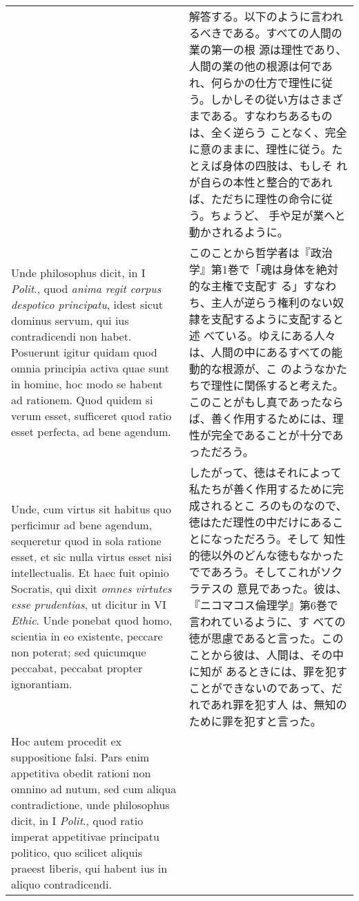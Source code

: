 \documentclass[10pt]{jsarticle}
\begin{document}
\begin{longtable}{p{21em}p{21em}}
&

 解答する。以下のように言われるべきである。すべての人間の業の第一の根
 源は理性であり、人間の業の他の根源は何であれ、何らかの仕方で理性に従
 う。しかしその従い方はさまざまである。すなわちあるものは、全く逆らう
 ことなく、完全に意のままに、理性に従う。たとえば身体の四肢は、もしそ
 れが自らの本性と整合的であれば、ただちに理性の命令に従う。ちょうど、
 手や足が業へと動かされるように。

 
\\

 Unde philosophus dicit, in I {\itshape Polit}., quod {\itshape anima
 regit corpus despotico principatu}, idest sicut dominus servum, qui
 ius contradicendi non habet. Posuerunt igitur quidam quod omnia
 principia activa quae sunt in homine, hoc modo se habent ad
 rationem. Quod quidem si verum esset, sufficeret quod ratio esset
 perfecta, ad bene agendum.


&

 このことから哲学者は『政治学』第1巻で「魂は身体を絶対的な主権で支配す
 る」すなわち、主人が逆らう権利のない奴隷を支配するように支配すると述
 べている。ゆえにある人々は、人間の中にあるすべての能動的な根源が、こ
 のようなかたちで理性に関係すると考えた。このことがもし真であったなら
 ば、善く作用するためには、理性が完全であることが十分であっただろう。

 
\\

 Unde, cum virtus sit habitus quo perficimur ad bene agendum,
 sequeretur quod in sola ratione esset, et sic nulla virtus esset nisi
 intellectualis. Et haec fuit opinio Socratis, qui dixit {\itshape
 omnes virtutes esse prudentias}, ut dicitur in VI {\itshape
 Ethic}. Unde ponebat quod homo, scientia in eo existente, peccare non
 poterat; sed quicumque peccabat, peccabat propter ignorantiam.

&

 したがって、徳はそれによって私たちが善く作用するために完成されるとこ
 ろのものなので、徳はただ理性の中だけにあることになっただろう。そして
 知性的徳以外のどんな徳もなかったでであろう。そしてこれがソクラテスの
 意見であった。彼は、『ニコマコス倫理学』第6巻で言われているように、す
 べての徳が思慮であると言った。このことから彼は、人間は、その中に知が
 あるときには、罪を犯すことができないのであって、だれであれ罪を犯す人
 は、無知のために罪を犯すと言った。

 
\\

 Hoc autem procedit ex suppositione falsi. Pars enim appetitiva obedit
 rationi non omnino ad nutum, sed cum aliqua contradictione, unde
 philosophus dicit, in I {\itshape Polit}., quod ratio imperat appetitivae
 principatu politico, quo scilicet aliquis praeest liberis, qui habent
 ius in aliquo contradicendi.



\end{longtable}
\end{document}
